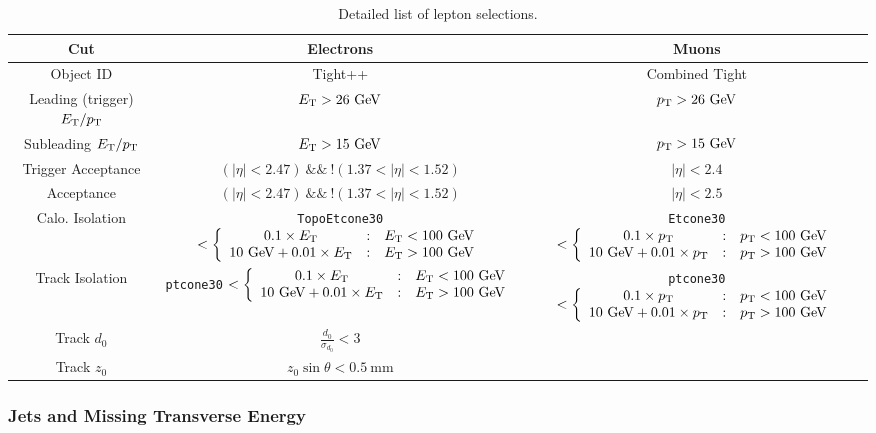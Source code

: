 \begin{table}[h]
	\footnotesize
		\begin{tabular}{ccc}
			Cut & Electrons & Muons \\
			\hline
			Object ID & Tight++ & Combined Tight \\
			Leading (trigger) $E_{\text{T}}/p_{\text{T}}$ & $E_{\text{T}}>26~\mbox{GeV}$ & $p_{\text{T}}>26~\mbox{GeV}$ \\
			Subleading $E_{\text{T}}/p_{\text{T}}$ & $E_{\text{T}}>15~\mbox{GeV}$ & $p_{\text{T}}>15~\mbox{GeV}$ \\
			Trigger Acceptance & $(|\eta|<2.47)\ \&\&\ !(1.37<|\eta|<1.52)$ & $|\eta|<2.4$ \\
			Acceptance & $(|\eta|<2.47)\ \&\&\ !(1.37<|\eta|<1.52)$ & $|\eta|<2.5$ \\
			Calo. Isolation & \verb.TopoEtcone30. $<\left\{\begin{array}{ccl} 0.1\times E_{\text{T}} & : & E_{\text{T}} < 100~\mbox{GeV} \\ 10~\mbox{GeV}+0.01\times E_{\text{T}} & : & E_{\text{T}}>100~\mbox{GeV} \end{array}\right.$ & \verb.Etcone30. $<\left\{\begin{array}{ccl} 0.1\times p_{\text{T}} & : & p_{\text{T}} < 100~\mbox{GeV} \\ 10~\mbox{GeV}+0.01\times p_{\text{T}} & : & p_{\text{T}}>100~\mbox{GeV} \end{array}\right.$ \\
			Track Isolation & \verb.ptcone30. $<\left\{\begin{array}{ccl} 0.1\times E_{\text{T}} & : & E_{\text{T}} < 100~\mbox{GeV} \\ 10~\mbox{GeV}+0.01\times E_{\text{T}} & : & E_{\text{T}}>100~\mbox{GeV} \end{array}\right.$ & \verb.ptcone30. $<\left\{\begin{array}{ccl} 0.1\times p_{\text{T}} & : & p_{\text{T}} < 100~\mbox{GeV} \\ 10~\mbox{GeV}+0.01\times p_{\text{T}} & : & p_{\text{T}}>100~\mbox{GeV} \end{array}\right.$ \\
			Track $d_0$ & $\frac{d_0}{\sigma_{d_0}}<3$  \\
			Track $z_0$ & $z_0\sin\theta<0.5~\mbox{mm}$  \\
		\end{tabular}
	\caption{Detailed list of lepton selections.}
	\label{table:lepton-selections}
\end{table}

\subsubsection{Jets and Missing Transverse Energy}\label{sec:model-independent-jets-met}

